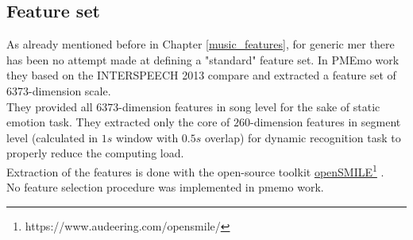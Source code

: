 \subsection{Feature set}
As already mentioned before in Chapter \ref{music_features}, for generic \gls{mer} there has been no attempt made at defining a "standard" feature set. In PMEmo work \cite{zhang2018pmemo} they based on the INTERSPEECH 2013 \gls{compare} \cite{schuller2013interspeech} and extracted a feature set of 6373-dimension scale.
\\
They provided all $6373$-dimension features in song level for the sake of static emotion task. They extracted only the core of $260$-dimension features in segment level (calculated in $1s$ window with $0.5s$ overlap) for dynamic recognition task to properly reduce the computing load.
\\
Extraction of the features is done with the open-source toolkit \href{https://www.audeering.com/opensmile/}{openSMILE}\footnote{https://www.audeering.com/opensmile/} \cite{eyben2013recent}.
\\
No feature selection procedure was implemented in \gls{pmemo} work.

\newpage
